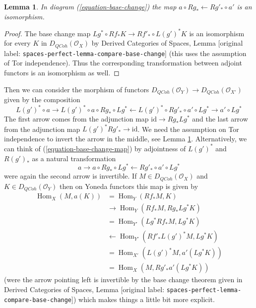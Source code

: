 \documentclass[10pt,a4paper]{article}
\theoremstyle{plain}
\newtheorem{lemma}[subsection]{Lemma}
\theoremstyle{definition}
\theoremstyle{remark}
\numberwithin{equation}{subsection}
\def\Hom{\mathop{\mathrm{Hom}}\nolimits}
\def\QCoh{\mathit{QCoh}}
\begin{document}
\begin{lemma}
\label{lemma-flat-precompose-pus}
In diagram (\ref{equation-base-change}) the map
$a \circ Rg_* \leftarrow Rg'_* \circ a'$ is an isomorphism.
\end{lemma}

\begin{proof}
The base change map $Lg^* \circ Rf_* K \to Rf'_* \circ L(g')^*K$
is an isomorphism for every $K$ in $D_\QCoh(\mathcal{O}_X)$ by
Derived Categories of Spaces, Lemma
\textnormal{[original label: \nolinkurl{spaces-perfect-lemma-compare-base-change}]}
(this uses the assumption of Tor independence).
Thus the corresponding transformation between adjoint functors
is an isomorphism as well.
\end{proof}

\noindent
Then we can consider the
morphism of functors
$D_\QCoh(\mathcal{O}_Y) \to D_\QCoh(\mathcal{O}_{X'})$
given by the composition
\begin{equation}
\label{equation-base-change-map}
L(g')^* \circ a \to
L(g')^* \circ a \circ Rg_* \circ Lg^* \leftarrow
L(g')^* \circ Rg'_* \circ a' \circ Lg^* \to a' \circ Lg^*
\end{equation}
The first arrow comes from the adjunction map $\text{id} \to Rg_* Lg^*$
and the last arrow from the adjunction map $L(g')^*Rg'_* \to \text{id}$.
We need the assumption on Tor independence to invert the arrow
in the middle, see Lemma \ref{lemma-flat-precompose-pus}.
Alternatively, we can think of (\ref{equation-base-change-map}) by
adjointness of $L(g')^*$ and $R(g')_*$ as a natural transformation
$$
a \to a \circ Rg_* \circ Lg^* \leftarrow Rg'_* \circ a' \circ Lg^*
$$
were again the second arrow is invertible. If $M \in D_\QCoh(\mathcal{O}_X)$
and $K \in D_\QCoh(\mathcal{O}_Y)$
then on Yoneda functors this map is given by
\begin{align*}
\Hom_X(M, a(K))
& =
\Hom_Y(Rf_*M, K) \\
& \to
\Hom_Y(Rf_*M, Rg_* Lg^*K) \\
& =
\Hom_{Y'}(Lg^*Rf_*M, Lg^*K) \\
& \leftarrow
\Hom_{Y'}(Rf'_* L(g')^*M, Lg^*K) \\
& =
\Hom_{X'}(L(g')^*M, a'(Lg^*K)) \\
& =
\Hom_X(M, Rg'_*a'(Lg^*K))
\end{align*}
(were the arrow pointing left is invertible by the base
change theorem given in
Derived Categories of Spaces, Lemma
\textnormal{[original label: \nolinkurl{spaces-perfect-lemma-compare-base-change}]})
which makes things a little bit more explicit.
\end{document}
